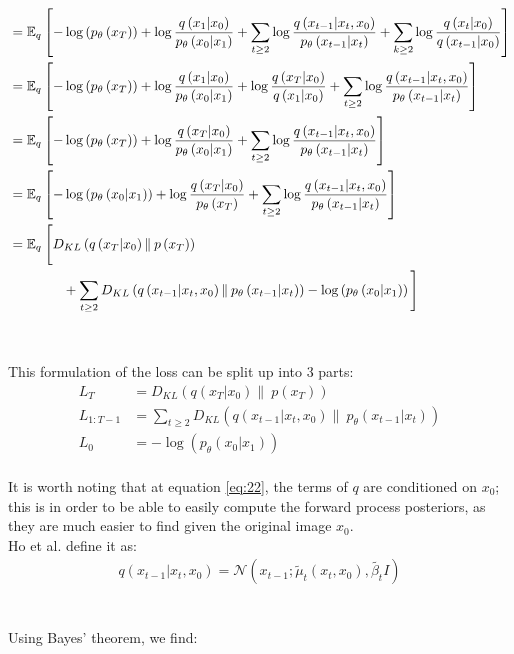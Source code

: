 \documentclass{article}
\begin{document}
\begin{align}
  &= \mathbb{E}_q \left[-\log\left(p_{\theta}\left(x_T\right)\right) + \log \frac{q\left(x_1 | x_0\right)}{p_{\theta}\left(x_0 | x_1\right)} + \sum_{t \geq 2} \log \frac{q\left(x_{t-1} | x_t, x_0\right)}{p_{\theta}\left(x_{t-1} | x_t\right)} + \sum_{k \geq 2} \log \frac{q\left(x_t | x_0\right)}{q\left(x_{t-1} | x_0\right)}\right] \\
  &= \mathbb{E}_q \left[-\log\left(p_{\theta}\left(x_T\right)\right) + \log \frac{q\left(x_1 | x_0\right)}{p_{\theta}\left(x_0 | x_1\right)} + \log \frac{q\left(x_T | x_0\right)}{q\left(x_1 | x_0\right)} + \sum_{t \geq 2} \log \frac{q\left(x_{t-1} | x_t, x_0\right)}{p_{\theta}\left(x_{t-1} | x_t\right)}\right] \\
  &= \mathbb{E}_q \left[-\log\left(p_{\theta}\left(x_T\right)\right) + \log \frac{q\left(x_T | x_0\right)}{p_{\theta}\left(x_0 | x_1\right)} + \sum_{t \geq 2} \log \frac{q\left(x_{t-1} | x_t, x_0\right)}{p_{\theta}\left(x_{t-1} | x_t\right)}\right] \\
  &= \mathbb{E}_q \left[- \log\left(p_{\theta}\left(x_0 | x_1\right)\right) + \log \frac{q\left(x_T | x_0\right)}{p_{\theta}\left(x_T\right)} + \sum_{t \geq 2} \log \frac{q\left(x_{t-1} | x_t, x_0\right)}{p_{\theta}\left(x_{t-1} | x_t\right)}\right] \\
  &= \mathbb{E}_q \: \Bigg[ D_{KL}\left(q\left(x_T | x_0\right) \| \: p\left(x_T\right)\right) \Bigg.  \\
  &\qquad \qquad \Bigg. + \sum_{t \geq 2} D_{KL}\left(q\left(x_{t-1} | x_t, x_0\right) \| \: p_{\theta}\left(x_{t-1} | x_t\right)\right) - \log\left(p_{\theta}\left(x_0 | x_1\right)\right) \Bigg] \notag
\end{align}
\\\\
This formulation of the loss can be split up into 3 parts:
\begin{align}
  L_T &= D_{KL}\left(q\left(x_T | x_0\right) \| \: p\left(x_T\right)\right) \\
  L_{1:T-1} &= \sum_{t \geq 2} D_{KL}\left(q\left(x_{t-1} | x_t, x_0\right) \| \: p_{\theta}\left(x_{t-1} | x_t\right)\right) \\
  L_0 &=  - \log\left(p_{\theta}\left(x_0 | x_1\right)\right)
\end{align}
\\
It is worth noting that at equation \ref{eq:22}, the terms of $q$ are conditioned on $x_0$; this is in order to be able to easily compute the forward process posteriors, as they are much easier to find given the original image $x_0$. \\
Ho et al. \cite{ho2020denoising} define it as:
\begin{gather}
  q\left(x_{t-1} | x_t, x_0\right) = \mathcal{N}\left(x_{t-1}; \tilde{\mu}_t \left(x_t, x_0\right), \tilde{\beta_t} I\right)
\end{gather}
\\\\
Using Bayes' theorem, we find:
\end{document}
